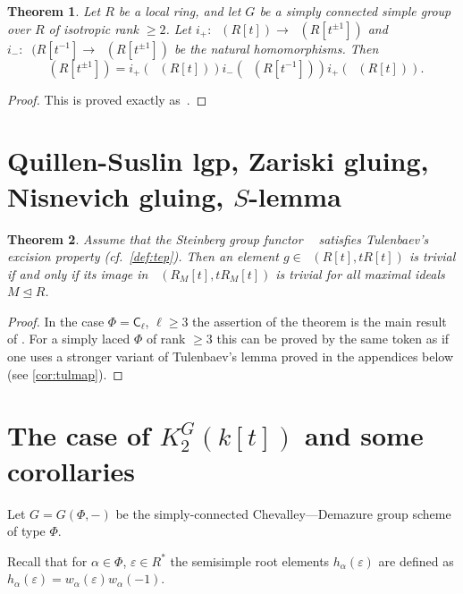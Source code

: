 \documentclass[oneside,12pt]{amsart}
\newtheorem{thm}{Theorem}
\numberwithin{equation}{section}
\numberwithin{lem}{section}
\theoremstyle{definition}
\theoremstyle{remark}
\DeclareMathOperator{\St}{St^G}
\newcommand{\rC}{\mathsf{C}}
\begin{document}
\begin{thm}\label{thm:3t}
Let $R$ be a local ring, and let $G$ be a simply connected simple group over $R$
of isotropic rank $\ge 2$. Let $i_+:\St(R[t])\to\St(R[t^{\pm 1}])$ and $i_-:\St(R[t^{-1}]\to
\St(R[t^{\pm 1}])$ be the natural homomorphisms.
Then
$$
\St(R[t^{\pm 1}])=i_+(\St(R[t]))i_-(\St(R[t^{-1}]))i_+(\St(R[t])).
$$
\end{thm}
\begin{proof}
This is proved exactly as~\cite[Theorem 5.1]{St-poly}.
\end{proof}


\section{Quillen-Suslin lgp, Zariski gluing, Nisnevich gluing, $S$-lemma}

\begin{thm}\label{thm:lg-k2}
Assume that the Steinberg group functor $\St$ satisfies Tulenbaev's excision property (cf.~\cref{def:tep}).
Then an element $g \in \St(R[t], tR[t])$ is trivial if and only if its image in $\St(R_M[t], tR_M[t])$ is trivial for all maximal ideals $M \trianglelefteq R$.
\end{thm}
\begin{proof}
In the case $\Phi=\rC_\ell$, $\ell\geq 3$ the assertion of the theorem is the main result of \cite{La15}.
For a simply laced $\Phi$ of rank $\geq 3$ this can be proved by the same token as \cite[Theorem~2]{S15} if one uses a stronger variant of Tulenbaev's lemma proved in the appendices below (see \cref{cor:tulmap}).
\end{proof}

\section{The case of \texorpdfstring{$K_2^G(k[t])$}{K\texttwoinferior(k[t])} and some corollaries}
Let $G = G(\Phi, -)$ be the simply-connected Chevalley---Demazure group scheme of type $\Phi$.

Recall that for $\alpha\in\Phi$, $\varepsilon\in R^*$ the semisimple root elements $h_\alpha(\varepsilon)$ are defined as $h_\alpha(\varepsilon)=w_\alpha(\varepsilon)w_\alpha(-1)$.
\end{document}
